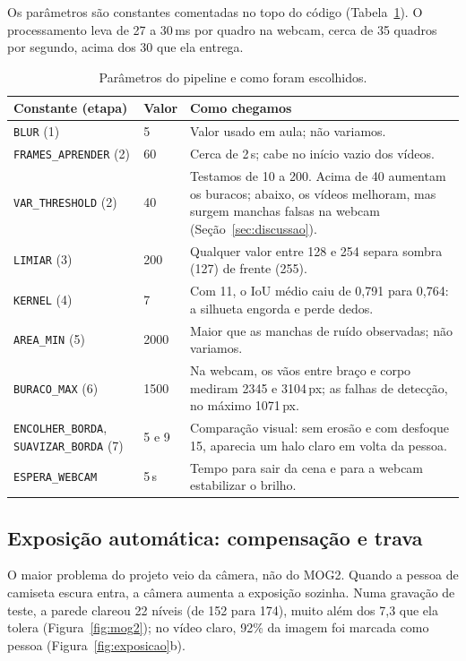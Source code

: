 Os parâmetros são constantes comentadas no topo do código
(Tabela~\ref{tab:parametros}). O processamento leva de 27 a 30\,ms por
quadro na webcam, cerca de 35 quadros por segundo, acima dos 30 que ela
entrega.

\begin{table}[H]
\centering
\caption{Parâmetros do pipeline e como foram escolhidos.}
\label{tab:parametros}
\small{}
\begin{tabularx}{\linewidth}{>{\raggedright\arraybackslash}p{3.6cm} l >{\raggedright\arraybackslash}X}
\toprule
Constante (etapa) & Valor & Como chegamos \\
\midrule
\texttt{BLUR} (1) & 5 & Valor usado em aula; não variamos. \\
\texttt{FRAMES\_APRENDER} (2) & 60 & Cerca de 2\,s; cabe no início vazio dos vídeos. \\
\texttt{VAR\_THRESHOLD} (2) & 40 & Testamos de 10 a 200. Acima de 40 aumentam os buracos; abaixo, os vídeos melhoram, mas surgem manchas falsas na webcam (Seção~\ref{sec:discussao}). \\
\texttt{LIMIAR} (3) & 200 & Qualquer valor entre 128 e 254 separa sombra (127) de frente (255). \\
\texttt{KERNEL} (4) & 7 & Com 11, o IoU médio caiu de 0,791 para 0,764: a silhueta engorda e perde dedos. \\
\texttt{AREA\_MIN} (5) & 2000 & Maior que as manchas de ruído observadas; não variamos. \\
\texttt{BURACO\_MAX} (6) & 1500 & Na webcam, os vãos entre braço e corpo mediram 2345 e 3104\,px; as falhas de detecção, no máximo 1071\,px. \\
\texttt{ENCOLHER\_BORDA}, \texttt{SUAVIZAR\_BORDA} (7) & 5 e 9 & Comparação visual: sem erosão e com desfoque 15, aparecia um halo claro em volta da pessoa. \\
\texttt{ESPERA\_WEBCAM} & 5\,s & Tempo para sair da cena e para a webcam estabilizar o brilho. \\
\bottomrule
\end{tabularx}
\end{table}

\subsection{Exposição automática: compensação e trava}
\label{sec:exposicao}

O maior problema do projeto veio da câmera, não do MOG2. Quando a
pessoa de camiseta escura entra, a câmera aumenta a exposição sozinha.
Numa gravação de teste, a parede clareou 22 níveis (de 152 para 174),
muito além dos 7,3 que ela tolera (Figura~\ref{fig:mog2}); no vídeo
claro, 92\% da imagem foi marcada como pessoa
(Figura~\ref{fig:exposicao}b).

